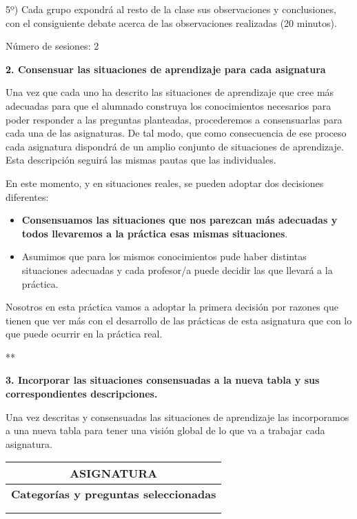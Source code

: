 \documentclass[
]{article}
\providecommand{\tightlist}{%
  \setlength{\itemsep}{0pt}\setlength{\parskip}{0pt}}
\begin{document}
5º) Cada grupo expondrá al resto de la clase sus observaciones y
conclusiones, con el consiguiente debate acerca de las observaciones
realizadas (20 minutos).

Número de sesiones: 2

\textbf{2. Consensuar las situaciones de aprendizaje para cada
asignatura}

Una vez que cada uno ha descrito las situaciones de aprendizaje que cree
más adecuadas para que el alumnado construya los conocimientos
necesarios para poder responder a las preguntas planteadas, procederemos
a consensuarlas para cada una de las asignaturas. De tal modo, que como
consecuencia de ese proceso cada asignatura dispondrá de un amplio
conjunto de situaciones de aprendizaje. Esta descripción seguirá las
mismas pautas que las individuales.

En este momento, y en situaciones reales, se pueden adoptar dos
decisiones diferentes:

\begin{itemize}
\tightlist
\item
  \textbf{Consensuamos las situaciones que nos parezcan más adecuadas y
  todos llevaremos a la práctica esas mismas situaciones}.
\item
  Asumimos que para los mismos conocimientos pude haber distintas
  situaciones adecuadas y cada profesor/a puede decidir las que llevará
  a la práctica.
\end{itemize}

Nosotros en esta práctica vamos a adoptar la primera decisión por
razones que tienen que ver más con el desarrollo de las prácticas de
esta asignatura que con lo que puede ocurrir en la práctica real.

**

\textbf{3. Incorporar las situaciones consensuadas a la nueva tabla y
sus correspondientes descripciones.}

Una vez descritas y consensuadas las situaciones de aprendizaje las
incorporamos a una nueva tabla para tener una visión global de lo que va
a trabajar cada asignatura.

\begin{longtable}[]{@{}c@{}}
\toprule
\textbf{ASIGNATURA} \\
\midrule
\endhead
\textbf{Categorías y preguntas seleccionadas} \\
 \\
 \\
\bottomrule
\end{longtable}
\end{document}
